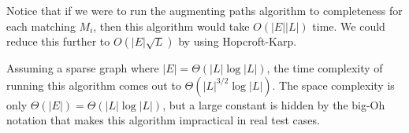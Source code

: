 Notice that if we were to run the augmenting paths algorithm to completeness
for each matching $M_i$, then this algorithm would take $O(|E||L|)$ time. We
could reduce this further to $O(|E|\sqrt{L})$ by using Hopcroft-Karp.
\cite{HopcroftKarp} \vs

Assuming
a sparse graph where $|E|=\Theta(|L|\log|L|)$, the time complexity of running
this algorithm comes out to $\Theta(|L|^{3/2}\log|L|)$.  The space complexity
is only $\Theta(|E|) = \Theta(|L|\log|L|)$, but a large constant is hidden by
the big-Oh notation that makes this algorithm impractical in real test cases. 